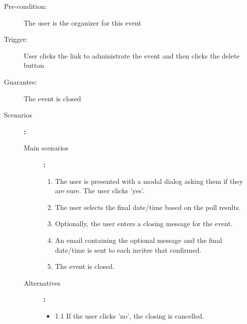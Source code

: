 \begin{description}
	\item[Pre-condition:] The user is the organizer for this event
	\item[Trigger:] User clicks the link to administrate the event and then clicks the delete button
	\item[Guarantee:] The event is closed
	\item[Scenarios]\textbf{:}\\
				\begin{description}
					\item[Main scenarios]\textbf{:}\\
								\begin{enumerate}
									\item The user is presented with a modal dialog asking them if they are sure. The user clicks 'yes'.
									\item The user selects the final date/time based on the poll results.
									\item Optionally, the user enters a closing message for the event.
									\item An email containing the optional message and the final date/time is sent to each invitee that confirmed.
									\item The event is closed.
								\end{enumerate}
					\item[Alternatives]\textbf{:}\\
								\begin{itemize}
									\item 1.1 If the user clicks 'no', the closing is cancelled.
								\end{itemize}

				\end{description}
\end{description}

